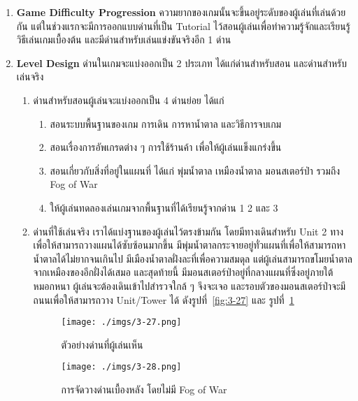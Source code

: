 \documentclass[12pt,oneside,openright,a4paper]{cpe-thai-project}
\begin{document}
\begin{enumerate}
  \item \textbf{Game Difficulty Progression}
  ความยากของเกมนั้นจะขึ้นอยู่ระดับของผู้เล่นที่เล่นด้วยกัน แต่ในช่วงแรกจะมีการออกแบบด่านที่เป็น 
  Tutorial ไว้สอนผู้เล่นเพื่อทำความรู้จักและเรียนรู้วิธีเล่นเกมเบื้องต้น 
  และมีด่านสำหรับเล่นแข่งขันจริงอีก 1 ด่าน

  \item \textbf{Level Design}
  ด่านในเกมจะแบ่งออกเป็น 2 ประเภท ได้แก่ด่านสำหรับสอน และด่านสำหรับเล่นจริง
  \begin{enumerate}
    \item ด่านสำหรับสอนผู้เล่นจะแบ่งออกเป็น 4 ด่านย่อย ได้แก่
    \begin{enumerate}
      \item สอนระบบพื้นฐานของเกม การเดิน การหาน้ำตาล และวิธีการจบเกม
      \item สอนเรื่องการอัพเกรดต่าง ๆ การใช้ร้านค้า เพื่อให้ผู้เล่นแข็งแกร่งขึ้น
      \item สอนเกี่ยวกับสิ่งที่อยู่ในแผนที่ ได้แก่ พุ่มน้ำตาล เหมืองน้ำตาล มอนสเตอร์ป่า รวมถึง Fog of War
      \item ให้ผู้เล่นทดลองเล่นเกมจากพื้นฐานที่ได้เรียนรู้จากด่าน 1 2 และ 3
    \end{enumerate}

    \item ด่านที่ใช้เล่นจริง เราได้แบ่งฐานของผู้เล่นไว้ตรงข้ามกัน 
    โดยมีทางเดินสำหรับ Unit 2 ทางเพื่อให้สามารถวางแผนได้ซับซ้อนมากขึ้น 
    มีพุ่มน้ำตาลกระจายอยู่ทั่วแผนที่เพื่อให้สามารถหาน้ำตาลได้ไม่ยากจนเกินไป 
    มีเมืองน้ำตาลฝั่งละที่เพื่อความสมดุล แต่ผู้เล่นสามารถขโมยน้ำตาลจากเหมืองของอีกฝั่งได้เสมอ 
    และสุดท้ายนี้ มีมอนสเตอร์ป่าอยู่ที่กลางแผนที่ซึ่งอยู่ภายใต้หมอกหนา 
    ผู้เล่นจะต้องเดินเข้าไปสำรวจใกล้ ๆ จึงจะเจอ 
    และรอบตัวของมอนสเตอร์ป่าจะมีถนนเพื่อให้สามารถวาง Unit/Tower ได้ ดังรูปที่~\ref{fig:3-27} และ รูปที่~\ref{fig:3-28}

    \begin{figure}[H]\centering
      \begin{minipage}{.45\textwidth}
        \centering
        \texttt{[image: ./imgs/3-27.png]}
        \caption{ตัวอย่างด่านที่ผู้เล่นเห็น}\label{fig:3-27}
      \end{minipage}
      \begin{minipage}{.45\textwidth}
        \centering
        \texttt{[image: ./imgs/3-28.png]}
        \caption{การจัดวางด่านเบื้องหลัง โดยไม่มี Fog of War}\label{fig:3-28}
      \end{minipage}
    \end{figure}
  
  \end{enumerate}
\end{enumerate}
\end{document}
